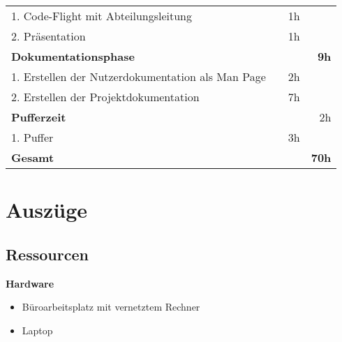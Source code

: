 \begin{table}[!htp]
\begin{tabular}{|lrrr|}
1. Code-Flight mit Abteilungsleitung                               &                                  & 1h                               &                                               \\
\rowcolor[HTML]{BBDAFF}
2. Präsentation                                                    &                                  & 1h                               &                                               \\ \hline
\rowcolor[HTML]{9698ED}
{\color[HTML]{FFFFFF} \textbf{Dokumentationsphase}}              & {\color[HTML]{FFFFFF} }          & {\color[HTML]{FFFFFF} }          & {\color[HTML]{FFFFFF} \textbf{9h}}          \\ \hline
1. Erstellen der Nutzerdokumentation als Man Page                  &                                  & 2h                               &                                               \\
\rowcolor[HTML]{BBDAFF}
2. Erstellen der Projektdokumentation                              &                                  & 7h                               &                                               \\ \hline
\rowcolor[HTML]{9698ED}
{\color[HTML]{FFFFFF} \textbf{Pufferzeit}}                                  & {\color[HTML]{FFFFFF} }          & {\color[HTML]{FFFFFF} }          & {\color[HTML]{FFFFFF} 2h}                     \\ \hline
1. Puffer                                                          &                                  & 3h                               &                                               \\ \hline
\rowcolor[HTML]{9698ED}
{\color[HTML]{FFFFFF} \textbf{Gesamt}}                           & {\color[HTML]{FFFFFF} }          & {\color[HTML]{FFFFFF} }          & {\color[HTML]{FFFFFF} \textbf{70h}}         \\ \hline
\end{tabular}
\end{table}


\clearpage
\section{Auszüge}
\subsection{Ressourcen}
\label{auszug:ressourcen}
\textbf{Hardware}
\begin{itemize}
    \item Büroarbeitsplatz mit vernetztem Rechner
    \item Laptop
\end{itemize}

